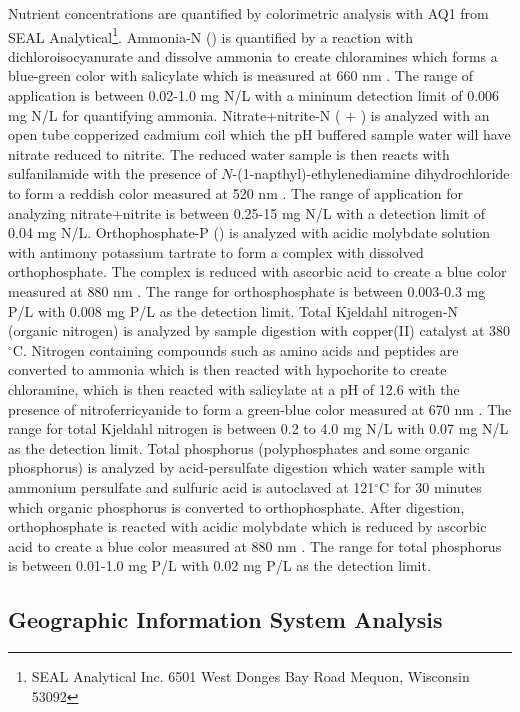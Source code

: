 Nutrient concentrations are quantified by colorimetric analysis with  AQ1 from SEAL Analytical\footnote{SEAL Analytical Inc.
6501 West Donges Bay Road Mequon, Wisconsin 53092}.  Ammonia-N () is quantified by a reaction with dichloroisocyanurate and dissolve ammonia to create chloramines which  forms a blue-green color with salicylate which is measured at 660 nm \cite{usepa_method_1993-2}. The range of application is between 0.02-1.0 mg N/L with a mininum detection limit of 0.006 mg N/L for quantifying ammonia.  Nitrate+nitrite-N ( $+$ ) is analyzed with an open tube copperized cadmium coil which the pH buffered sample water will have nitrate reduced to nitrite. The reduced water sample is then reacts with sulfanilamide with the presence of $N$-(1-napthyl)-ethylenediamine dihydrochloride to form a reddish color measured at 520 nm \cite{usepa_method_1993}. The range of application for analyzing nitrate+nitrite is between 0.25-15 mg N/L with a detection limit of 0.04 mg N/L.  Orthophosphate-P () is analyzed with acidic molybdate solution with antimony potassium tartrate to form a complex with dissolved orthophosphate. The complex is reduced with ascorbic acid to create a blue color measured at 880 nm \cite{usepa_method_1993-3}. The range for orthosphosphate is between 0.003-0.3 mg P/L with 0.008 mg P/L as the detection limit. Total Kjeldahl nitrogen-N (organic nitrogen) is analyzed by sample digestion with copper(II) catalyst at 380$^\circ$C. Nitrogen containing compounds such as amino acids and peptides are converted to ammonia which is then reacted with hypochorite to create chloramine, which is then reacted with salicylate at a pH of 12.6 with the presence of nitroferricyanide to form a green-blue color measured at 670 nm \cite{usepa_method_1993-1}. The range for total Kjeldahl nitrogen is between 0.2 to 4.0 mg N/L with 0.07 mg N/L as the detection limit. Total phosphorus (polyphosphates and some organic phosphorus)  is analyzed by acid-persulfate digestion which water sample with ammonium persulfate and sulfuric acid is autoclaved at 121$^\circ$C for 30 minutes which organic phosphorus is converted to orthophosphate. After digestion, orthophosphate is reacted with acidic molybdate which is reduced by ascorbic acid to create a blue color measured at 880 nm \cite{usepa_method_1993-3}. The range for total phosphorus is between 0.01-1.0 mg P/L with 0.02 mg P/L as the detection limit. 


\subsection{Geographic Information System Analysis}

